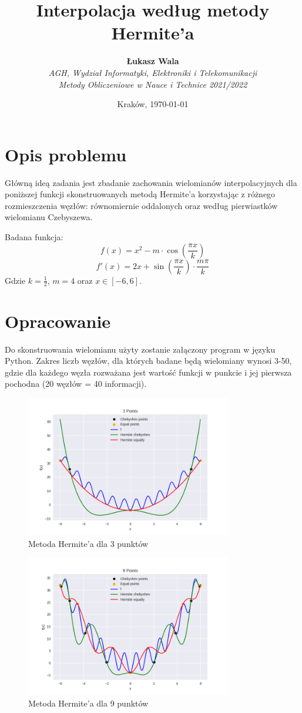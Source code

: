 \documentclass{article}
\title{Interpolacja według metody Hermite'a}
\author{\textbf{Łukasz Wala}\\
    \textit{AGH, Wydział Informatyki, Elektroniki i Telekomunikacji} \\
    \textit{Metody Obliczeniowe w Nauce i Technice 2021/2022}}
\date{Kraków, \today}
\begin{document}
\maketitle

\section{Opis problemu}
Główną ideą zadania jest zbadanie zachowania wielomianów interpolacyjnych
dla poniższej funkcji skonstruowanych metodą Hermite'a korzystając z różnego 
rozmieszczenia węzłów: równomiernie oddalonych oraz według pierwiastków wielomianu
Czebyszewa.

Badana funkcja:
\[f(x)=x^2-m\cdot\cos\left(\frac{\pi x}{k}\right)\]
\[f'(x) = 2x+\sin(\frac{\pi x}{k})\cdot\frac{m\pi}{k}\]
Gdzie $k=\frac{1}{2}$, $m=4$ oraz $x\in [-6,6]$.


\section{Opracowanie}
Do skonstruowania wielomianu użyty zostanie załączony program w języku Python. Zakres liczb węzłów, dla których
badane będą wielomiany wynosi 3-50, gdzie dla każdego węzła rozważana jest wartość funkcji w punkcie i jej pierwsza pochodna
(20 węzłów = 40 informacji).

\begin{figure}[H]
    \centering
    \includegraphics[width=0.8\textwidth]{img/herm_3.png}
    \caption{Metoda Hermite'a dla 3 punktów}
\end{figure}

\begin{figure}[H]
    \centering
    \includegraphics[width=0.8\textwidth]{img/herm_9.png}
    \caption{Metoda Hermite'a dla 9 punktów}
\end{figure}
\end{document}

